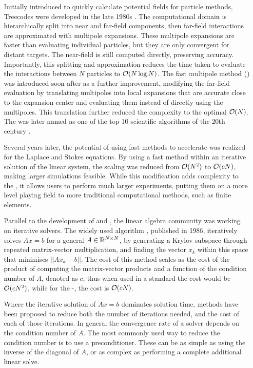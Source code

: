 Initially introduced to quickly calculate potential fields for particle methods, Treecodes were developed in the late 1980s \cite{BarnesHut1986}. The computational domain is hierarchically split into near and far-field components, then far-field interactions are approximated with multipole expansions. These multipole expansions are faster than evaluating individual particles, but they are only convergent for distant targets. The near-field is still computed directly, preserving accuracy. Importantly, this splitting and approximation reduces the time taken to evaluate the interactions between $N$ particles to $\mathcal{O}(N\log N)$. The fast multipole method ({\fmm}) was introduced soon after as a further improvement, modifying the far-field evaluation by translating multipoles into local expansions \cite{greengard1987} that are accurate close to the expansion center and evaluating them instead of directly using the multipoles. This translation further reduced the complexity to the optimal $\mathcal{O}(N)$. The {\fmm} was later named as one of the top 10 scientific algorithms of the 20th century \cite{DongarraSulli2000}.

Several years later, the potential of using fast methods to accelerate {\bem} was realized for the Laplace\cite{Nabors94} and Stokes \cite{gomez1997} equations. By using a fast method within an iterative solution of the {\bem} linear system, the scaling was reduced from $\mathcal{O}(N^{2})$ to $\mathcal{O}(cN)$, making larger simulations feasible. While this modification adds complexity to the {\bem}, it allows users to perform much larger experiments, putting them on a more level playing field to more traditional computational methods, such as finite elements.

Parallel to the development of {\bem} and {\fmm}, the linear algebra community was working on iterative solvers. The widely used {\gmres} algorithm \cite{SaadSchultz1986}, published in 1986, iteratively solves $Ax = b$ for a general $A \in \mathbb{R}^{N\times N}$, by generating a Krylov subspace through repeated matrix-vector multiplication, and finding the vector $x_{k}$ within this space that minimises $||Ax_{k}-b||$. The cost of this method scales as the cost of the product of computing the matrix-vector products and a function of the condition number of $A$, denoted as $c$, thus when used in a standard {\bem} the cost would be $\mathcal{O}(cN^{2})$, while for the {\fmm}-{\bem}, the cost is $\mathcal{O}(cN)$.

Where the iterative solution of $Ax = b$ dominates solution time, methods have been proposed to reduce both the number of iterations needed, and the cost of each of those iterations. In general the convergence rate of a solver depends on the condition number of $A$. The most commonly used way to reduce the condition number is to use a preconditioner. These can be as simple as using the inverse of the diagonal of $A$, or as complex as performing a complete additional linear solve. 

